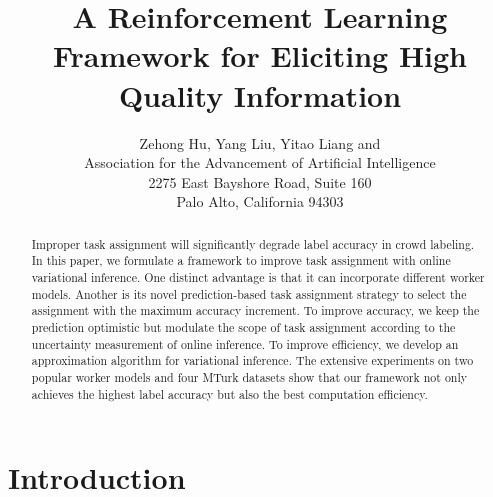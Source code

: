 \documentclass[letterpaper]{article} %
\begin{document}
%
\title{A Reinforcement Learning Framework for Eliciting High Quality Information}
\author{Zehong Hu, Yang Liu, Yitao Liang and \\
Association for the Advancement of Artificial Intelligence\\
2275 East Bayshore Road, Suite 160\\
Palo Alto, California 94303\\}
\maketitle
\begin{abstract}
Improper task assignment will significantly degrade label accuracy
in crowd labeling. In this paper, we formulate a framework to
improve task assignment with online variational inference. One
distinct advantage is that it can incorporate different worker
models. Another is its novel prediction-based task assignment
strategy to select the assignment with the maximum accuracy
increment. To improve accuracy, we keep the prediction optimistic
but modulate the scope of task assignment according to the
uncertainty measurement of online inference. To improve
efficiency, we develop an approximation algorithm for variational
inference. The extensive experiments on two popular worker models
and four MTurk datasets show that our framework not only achieves
the highest label accuracy but also the best computation
efficiency.
\end{abstract}

\section{Introduction}



\end{document}

